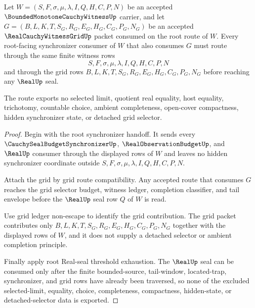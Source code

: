 \begin{theorem}
\label{thm:bounded-monotone-cauchy-witness-synchronizer-grid-route}
Let $W=(S,F,\sigma,\mu,\lambda,I,Q,H,C,P,N)$ be an accepted $\BoundedMonotoneCauchyWitnessUp$ carrier, and let $G=(B,L,K,T,S_G,R_G,E_G,H_G,C_G,P_G,N_G)$ be an accepted $\RealCauchyWitnessGridUp$ packet consumed on the root route of $W$. Every root-facing synchronizer consumer of $W$ that also consumes $G$ must route through the same finite witness rows
$$
S,F,\sigma,\mu,\lambda,I,Q,H,C,P,N
$$
and through the grid rows $B,L,K,T,S_G,R_G,E_G,H_G,C_G,P_G,N_G$ before reaching any $\RealUp$ seal.

The route exports no selected limit, quotient real equality, host equality, trichotomy, countable choice, ambient completeness, open-cover compactness, hidden synchronizer state, or detached grid selector.
\end{theorem}
\begin{proof}
Begin with the root synchronizer handoff. It sends every $\CauchySealBudgetSynchronizerUp$, $\RealObservationBudgetUp$, and $\RealUp$ consumer through the displayed rows of $W$ and leaves no hidden synchronizer coordinate outside $S,F,\sigma,\mu,\lambda,I,Q,H,C,P,N$.

Attach the grid by grid route compatibility. Any accepted route that consumes $G$ reaches the grid selector budget, witness ledger, completion classifier, and tail envelope before the $\RealUp$ seal row $Q$ of $W$ is read.

Use grid ledger non-escape to identify the grid contribution. The grid packet contributes only $B,L,K,T,S_G,R_G,E_G,H_G,C_G,P_G,N_G$ together with the displayed rows of $W$, and it does not supply a detached selector or ambient completion principle.

Finally apply root Real-seal threshold exhaustion. The $\RealUp$ seal can be consumed only after the finite bounded-source, tail-window, located-trap, synchronizer, and grid rows have already been traversed, so none of the excluded selected-limit, equality, choice, completeness, compactness, hidden-state, or detached-selector data is exported.
\end{proof}

